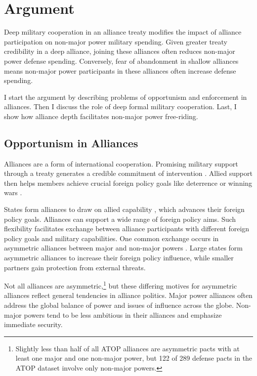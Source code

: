 \documentclass[12pt]{article}
\begin{document}
\section*{Argument}

Deep military cooperation in an alliance treaty modifies the impact of alliance participation on non-major power military spending.
Given greater treaty credibility in a deep alliance, joining these alliances often reduces non-major power defense spending.
Conversely, fear of abandonment in shallow alliances means non-major power participants in these alliances often increase defense spending.  


I start the argument by describing problems of opportunism and enforcement in alliances. 
Then I discuss the role of deep formal military cooperation. 
Last, I show how alliance depth facilitates non-major power free-riding. 


\subsection*{Opportunism in Alliances}

Alliances are a form of international cooperation. 
Promising military support through a treaty generates a credible commitment of intervention \citep{Fearon1997, Morrow2000}. 
Allied support then helps members achieve crucial foreign policy goals like deterrence or winning wars \citep{Walt1990, Snyder1997}. 


States form alliances to draw on allied capability \citep{FordhamPoast2014}, which advances their foreign policy goals.
Alliances can support a wide range of foreign policy aims.
Such flexibility facilitates exchange between alliance participants with different foreign policy goals and military capabilities. 
One common exchange occurs in asymmetric alliances between major and non-major powers \citep{Morrow1991}. 
Large states form asymmetric alliances to increase their foreign policy influence, while smaller partners gain protection from external threats. 


Not all alliances are asymmetric,\footnote{Slightly less than half of all ATOP alliances are asymmetric pacts with at least one major and one non-major power, but 122 of 289 defense pacts in the ATOP dataset involve only non-major powers.} but these differing motives for asymmetric alliances reflect general tendencies in alliance politics. 
Major power alliances often address the global balance of power and issues of influence across the globe. 
Non-major powers tend to be less ambitious in their alliances and emphasize immediate security. 
\end{document}
